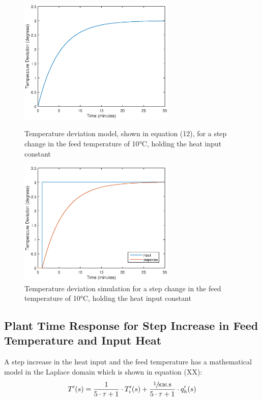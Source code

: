 \documentclass{article}
\begin{document}
\begin{figure}[h]
\begin{minipage}{0.45\textwidth}
\centering
\includegraphics[height=6cm]{1b_mod}
\caption{Temperature deviation model, shown in equation (12), for a step change in the feed temperature of 10$\si{\degreeCelsius}$, holding the heat input constant}
\end{minipage}
\hspace{1cm}
\begin{minipage}{0.45\textwidth}
\centering
\includegraphics[height=6cm]{1b_sim}
\caption{Temperature deviation simulation for a step change in the feed temperature of 10$\si{\degreeCelsius}$, holding the heat input constant}
\end{minipage}
\end{figure}

\subsection{Plant Time Response for Step Increase in Feed Temperature and Input Heat}

A step increase in the heat input and the feed temperature has a mathematical model in the Laplace domain which is shown in equation (XX):
\begin{align}
T'(s) = \frac{1}{5 \cdot \tau + 1} \cdot T'_i(s) + \frac{\sfrac{1}{836.8}}{5 \cdot \tau + 1} \cdot q'_h(s)
\end{align} 
\end{document}

